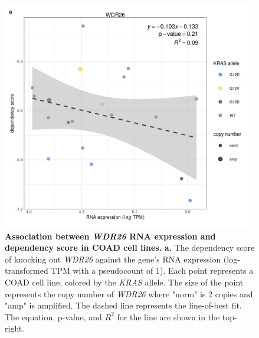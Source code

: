 \documentclass[english, 10pt, letterpaper]{article}
\newcommand{\KRAS}{\emph{KRAS}}
\begin{document}
\begin{figure}[p]
\centering
\includegraphics[height=100mm]{figures/SuppFigure_15.jpeg}
\caption{
    \textbf{Association between \emph{WDR26} RNA expression and dependency score in COAD cell lines.}
    \textbf{a.} The dependency score of knocking out \emph{WDR26} against the gene's RNA expression (log-transformed TPM with a pseudocount of 1). Each point represents a COAD cell line, colored by the \KRAS{} allele. The size of the point represents the copy number of \emph{WDR26} where "norm" is 2 copies and "amp" is amplified.
    The dashed line represents the line-of-best fit.
    The equation, p-value, and $R^2$ for the line are shown in the top-right.
}
\label{sfig:coad_dep_wdr26}
\end{figure}
\end{document}
